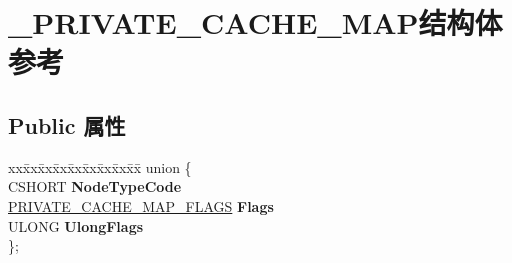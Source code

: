 \hypertarget{struct___p_r_i_v_a_t_e___c_a_c_h_e___m_a_p}{}\section{\+\_\+\+P\+R\+I\+V\+A\+T\+E\+\_\+\+C\+A\+C\+H\+E\+\_\+\+M\+A\+P结构体 参考}
\label{struct___p_r_i_v_a_t_e___c_a_c_h_e___m_a_p}
\subsection*{Public 属性}
\begin{DoxyCompactItemize}
\item 
\mbox{\label{struct___p_r_i_v_a_t_e___c_a_c_h_e___m_a_p_a3e9156db2cf9c4b56d0fe45570da56b2}} 
\begin{tabbing}
xx\=xx\=xx\=xx\=xx\=xx\=xx\=xx\=xx\=\kill
union \{\\
\>CSHORT {\bfseries NodeTypeCode}\\
\>\hyperlink{struct___p_r_i_v_a_t_e___c_a_c_h_e___m_a_p___f_l_a_g_s}{PRIVATE\_CACHE\_MAP\_FLAGS} {\bfseries Flags}\\
\>ULONG {\bfseries UlongFlags}\\
\}; \\


\end{tabbing}
\end{DoxyCompactItemize}
